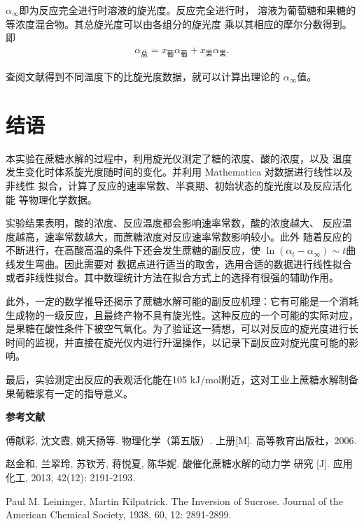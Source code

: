 \documentclass[12pt]{ctexart}
\numberwithin{equation}{section}
\begin{document}
$\alpha_\infty$即为反应完全进行时溶液的旋光度。反应完全进行时，
溶液为葡萄糖和果糖的等浓度混合物。其总旋光度可以由各组分的旋光度
乘以其相应的摩尔分数得到。即
\begin{align}
    \alpha_{\text{总}}
    = x_{\text{葡}} \alpha_{\text{葡}}
    + x_{\text{果}} \alpha_{\text{果}}.
\end{align}

查阅文献得到不同温度下的比旋光度数据，就可以计算出理论的
$\alpha_\infty$值。


\section{结语}

本实验在蔗糖水解的过程中，利用旋光仪测定了糖的浓度、酸的浓度，以及
温度发生变化时体系旋光度随时间的变化。并利用 Mathematica 对数据进行线性以及非线性
拟合，计算了反应的速率常数、半衰期、初始状态的旋光度以及反应活化能
等物理化学数据。

实验结果表明，酸的浓度、反应温度都会影响速率常数，酸的浓度越大、
反应温度越高，速率常数越大，而蔗糖浓度对反应速率常数影响较小。此外
随着反应的不断进行，在高酸高温的条件下还会发生蔗糖的副反应，使
$\ln(\alpha_t-\alpha_\infty) \sim t$曲线发生弯曲。因此需要对
数据点进行适当的取舍，选用合适的数据进行线性拟合或者非线性拟合。其中数理统计方法在拟合方式上的选择有很强的辅助作用。

此外，一定的数学推导还揭示了蔗糖水解可能的副反应机理：它有可能是一个消耗生成物的一级反应，且最终产物不具有旋光性。这种反应的一个可能的实际对应，是果糖在酸性条件下被空气氧化。为了验证这一猜想，可以对反应的旋光度进行长时间的监视，并直接在旋光仪内进行升温操作，以记录下副反应对旋光度可能的影响。

最后，实验测定出反应的表观活化能在105 kJ/mol附近，这对工业上蔗糖水解制备果葡糖浆有一定的指导意义。

\newpage

\begin{center}
    \Large\bfseries{参考文献}
\end{center}
\noindent
[1] 傅献彩, 沈文霞, 姚天扬等. 物理化学（第五版）. 上册[M].
高等教育出版社，2006.

\noindent
[2] 赵金和, 兰翠玲, 苏钦芳, 蒋悦夏, 陈华妮. 酸催化蔗糖水解的动力学
研究 [J]. 应用化工, 2013, 42(12): 2191-2193.

\noindent
[3] Paul M. Leininger, Martin Kilpatrick. The Inversion of
Sucrose. Journal of the American Chemical Society, 1938, 60,
12: 2891-2899.

\newpage
\end{document}
